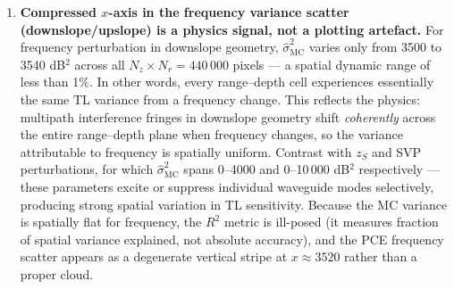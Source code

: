 \documentclass[11pt,a4paper]{article}
\begin{document}
\begin{enumerate}
        strongly multipath-sensitive acoustic environments.
        For such scenarios, Monte Carlo remains the reliable method and PCE should
        be used only as a fast-screening surrogate with its variance bias acknowledged.
  \item \textbf{Compressed $x$-axis in the frequency variance scatter (downslope/upslope)
        is a physics signal, not a plotting artefact.}
        For frequency perturbation in downslope geometry, $\widehat{\sigma}^2_\text{MC}$
        varies only from 3500 to 3540 dB$^2$ across all $N_z \times N_r = 440\,000$
        pixels --- a spatial dynamic range of less than 1\%.
        In other words, every range--depth cell experiences essentially the same
        TL variance from a frequency change.
        This reflects the physics: multipath interference fringes in downslope geometry
        shift \emph{coherently} across the entire range--depth plane when frequency
        changes, so the variance attributable to frequency is spatially uniform.
        Contrast with $z_S$ and SVP perturbations, for which
        $\widehat{\sigma}^2_\text{MC}$ spans 0--4000 and 0--10\,000 dB$^2$
        respectively --- these parameters excite or suppress individual waveguide modes
        selectively, producing strong spatial variation in TL sensitivity.
        Because the MC variance is spatially flat for frequency, the $R^2$ metric
        is ill-posed (it measures fraction of spatial variance explained, not absolute
        accuracy), and the PCE frequency scatter appears as a degenerate vertical
        stripe at $x \approx 3520$ rather than a proper cloud.
\end{enumerate}
\end{document}

